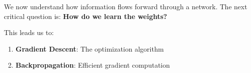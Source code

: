 \begin{bluebox}
We now understand how information flows forward through a network. The next critical question is: \textbf{How do we learn the weights?}

This leads us to:
\begin{enumerate}
    \item \textbf{Gradient Descent}: The optimization algorithm
    \item \textbf{Backpropagation}: Efficient gradient computation
\end{enumerate}
\end{bluebox}
